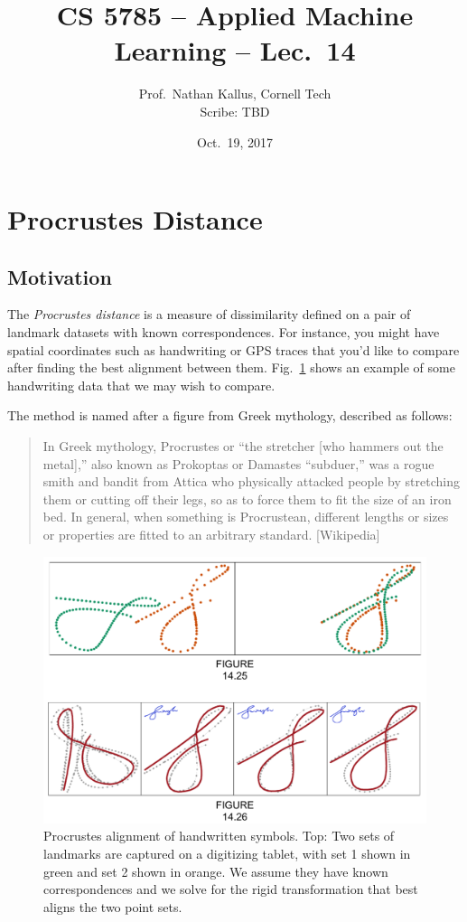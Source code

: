\documentclass[a4paper]{article}
\title{CS 5785 -- Applied Machine Learning -- Lec.\ 14}
\author{Prof.\ Nathan Kallus, Cornell Tech\\Scribe: TBD}
\date{Oct.\ 19, 2017}
\begin{document}
\maketitle
\section{Procrustes Distance}

\subsection{Motivation}

The \emph{Procrustes distance} is a measure of dissimilarity defined on a pair of landmark datasets with known correspondences.  For instance, you might have spatial coordinates such as handwriting or GPS traces that you'd like to compare after finding the best alignment between them.  
Fig.~\ref{fig:signatures} shows an example of some handwriting data that we may wish to compare.

The method is named after a figure from Greek mythology, described as follows:
\begin{quote}
In Greek mythology, Procrustes or ``the stretcher [who hammers out the metal],'' also known as Prokoptas or Damastes ``subduer,'' was a rogue smith and bandit from Attica who physically attacked people by stretching them or cutting off their legs, so as to force them to fit the size of an iron bed. In general, when something is Procrustean, different lengths or sizes or properties are fitted to an arbitrary standard. [Wikipedia]
\end{quote}

\begin{figure}
\centering
\includegraphics[width=1.0\textwidth]{fig14_26.png}
\caption{\label{fig:signatures}Procrustes alignment of handwritten symbols.  Top: Two sets of landmarks are captured on a digitizing tablet, with set 1 shown in green and set 2 shown in orange.  We assume they have known correspondences and we solve for the rigid transformation that best aligns the two point sets.}
\end{figure}
\end{document}

